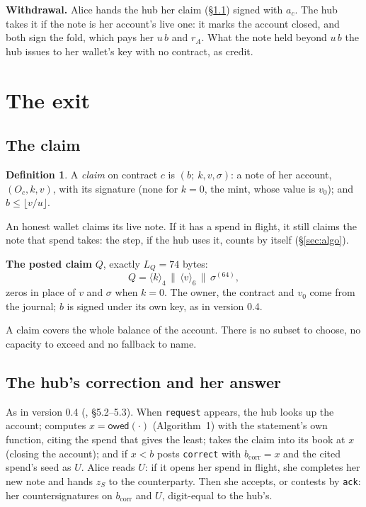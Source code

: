 \documentclass[11pt]{article}
\theoremstyle{plain}
\theoremstyle{definition}
\newtheorem{definition}{Definition}
\newcommand{\bcorr}{b_{\mathrm{corr}}}
\newcommand{\tx}[1]{\texttt{#1}}
\newcommand{\be}[2]{\langle #1\rangle_{#2}}
\newcommand{\owed}{\mathsf{owed}}
\newcommand{\Oc}{O_c}
\begin{document}
\textbf{Withdrawal.} Alice hands the hub her claim (\S\ref{sec:claim})
signed with $a_c$. The hub takes it if the note is her account's live
one: it marks the account closed, and both sign the fold, which pays her
$u\,b$ and $r_A$. What the note held beyond $u\,b$ the hub issues to
her wallet's key with no contract, as credit.

\section{The exit}\label{sec:exit}

\subsection{The claim}\label{sec:claim}

\begin{definition}
A \emph{claim} on contract $c$ is $(b;\ k, v, \sigma)$: a note of her
account, $(\Oc, k, v)$, with its signature (none for $k = 0$, the mint,
whose value is $v_0$); and $b \le \lfloor v/u \rfloor$.
\end{definition}

An honest wallet claims its live note. If it has a spend in flight, it
still claims the note that spend takes: the step, if the hub uses it,
counts by itself (\S\ref{sec:algo}).

\textbf{The posted claim} $Q$, exactly $L_Q = 74$ bytes:
\[
  Q = \be{k}{4} \,\|\, \be{v}{6} \,\|\, \sigma^{(64)},
\]
zeros in place of $v$ and $\sigma$ when $k = 0$. The owner, the contract
and $v_0$ come from the journal; $b$ is signed under its own key, as in
version 0.4.

A claim covers the whole balance of the account. There is no subset to
choose, no capacity to exceed and no fallback to name.

\subsection{The hub's correction and her answer}\label{sec:correct}

As in version 0.4 (\cite{grants04}, \S5.2--5.3). When \tx{request}
appears, the hub looks up the account; computes $x = \owed(\cdot)$
(Algorithm~1) with the statement's own function, citing the spend that
gives the least; takes the claim into its book at $x$ (closing the
account); and if $x < b$ posts \tx{correct} with $\bcorr = x$ and the
cited spend's seed as $U$. Alice reads $U$: if it opens her spend in
flight, she completes her new note and hands $z_S$ to the counterparty.
Then she accepts, or contests by \tx{ack}: her countersignatures on
$\bcorr$ and $U$, digit-equal to the hub's.
\end{document}
